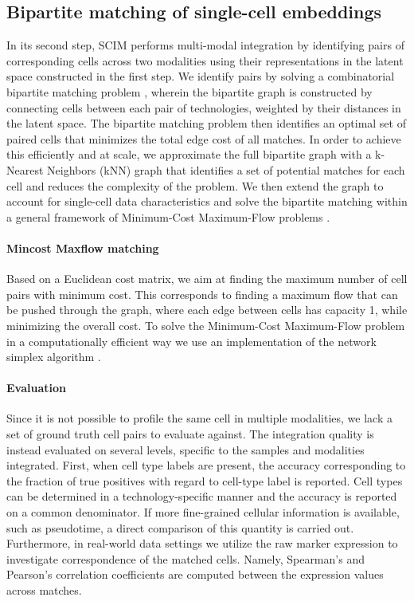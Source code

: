 \subsection{Bipartite matching of single-cell embeddings}
In its second step, SCIM performs multi-modal integration by identifying pairs of corresponding cells across two modalities using their representations in the latent space constructed in the first step.
We identify pairs by solving a combinatorial bipartite matching problem \cite{ahuja1993,dellamico2000}, wherein the bipartite graph is constructed by connecting cells between each pair of technologies, weighted by their distances in the latent space.
The bipartite matching problem then identifies an optimal set of paired cells that minimizes the total edge cost of all matches.
In order to achieve this efficiently and at scale, we approximate the full bipartite graph with a k-Nearest Neighbors (kNN) graph that identifies a set of potential matches for each cell and reduces the complexity of the problem.
We then extend the graph to account for single-cell data characteristics and solve the bipartite matching within a general framework of Minimum-Cost Maximum-Flow problems \cite{ahuja1993,klein1967}.

\paragraph{Min\-cost Max\-flow matching}
Based on a Euclidean cost matrix, we aim at finding the maximum number of cell pairs with minimum cost.
This corresponds to finding a maximum flow that can be pushed through the graph, where each edge between cells has capacity 1, while minimizing the overall cost.
To solve the Minimum-Cost Maximum-Flow problem in a computationally efficient way we use an implementation of the network simplex algorithm \cite{kiraly2012}.

\paragraph{Evaluation}
Since it is not possible to profile the same cell in multiple modalities, we lack a set of ground truth cell pairs to evaluate against.
The integration quality is instead evaluated on several levels, specific to the samples and modalities integrated.
First, when cell type labels are present, the accuracy corresponding to the fraction of true positives with regard to cell-type label is reported.
Cell types can be determined in a technology-specific manner and the accuracy is reported on a common denominator.
If more fine-grained cellular information is available, such as pseudotime, a direct comparison of this quantity is carried out.
Furthermore, in real-world data settings we utilize the raw marker expression to investigate correspondence of the matched cells.
Namely, Spearman’s and Pearson’s correlation coefficients are computed between the expression values across matches.

